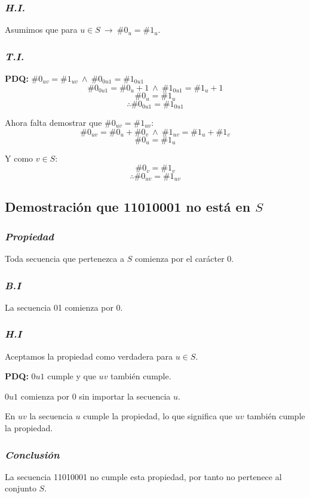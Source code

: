 \documentclass[../doc.tex]{subfiles}
\begin{document}
\subsubsection*{\emph{H.I.}}
Asumimos que para \(u \in S\ \rightarrow\ \#0_u = \#1_u\).

\subsubsection*{\emph{T.I.}}

\textbf{PDQ:} \(\#0_{uv} = \#1_{uv}\ \land\ \#0_{0u1} = \#1_{0u1}\)
\[\#0_{0u1} = \#0_u + 1\ \land\ \#1_{0u1} = \#1_u + 1\]
\[\#0_u = \#1_u\]
\[\therefore \#0_{0u1} = \#1_{0u1}\]

\noindent Ahora falta demostrar que \(\#0_{uv} = \#1_{uv}\):
\[\#0_{uv} = \#0_u + \#0_v\ \land\ \#1_{uv} = \#1_u + \#1_v\]
\[\#0_u = \#1_u\]

\noindent Y como \(v \in S\):
\[\#0_v = \#1_v\]
\[\therefore \#0_{uv} = \#1_{uv}\]

\subsection{Demostración que 11010001 no está en \(S\)}

\subsubsection*{\emph{Propiedad}}
Toda secuencia que pertenezca a \(S\) comienza por el carácter 0.

\subsubsection*{\emph{B.I}}
La secuencia 01 comienza por 0.

\subsubsection*{\emph{H.I}}
Aceptamos la propiedad como verdadera para \(u \in S\).

\textbf{PDQ:} \(0u1\) cumple y que \(uv\) también cumple.

\noindent \(0u1\) comienza por 0 sin importar la secuencia \(u\).

\noindent En \(uv\) la secuencia \(u\) cumple la propiedad, lo que significa
que \(uv\) también cumple la propiedad.

\subsubsection*{\emph{Conclusión}}
La secuencia 11010001 no cumple esta propiedad, por tanto no pertenece al
conjunto \(S\).
\end{document}
